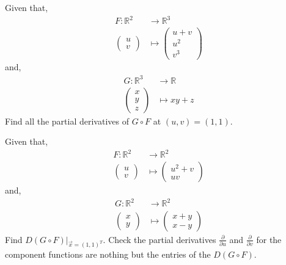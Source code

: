 \begin{example}
Given that,
\begin{align*}
F:\mathbb{R}^2&\to\mathbb{R}^3\\
\begin{pmatrix}
u\\
v
\end{pmatrix}&\mapsto
\begin{pmatrix}
u+v\\
u^2\\
v^3
\end{pmatrix}
\end{align*}
and,
\begin{align*}
G:\mathbb{R}^3&\to\mathbb{R}\\
\begin{pmatrix}
x\\
y\\
z
\end{pmatrix}
&\mapsto
xy+z
\end{align*}
Find all the partial derivatives of $G\circ F$ at $(u,v)=(1,1)$.
\end{example}

\begin{example}
Given that,
\begin{align*}
F:\mathbb{R}^2&\to\mathbb{R}^2\\
\begin{pmatrix}
u\\
v
\end{pmatrix}&\mapsto
\begin{pmatrix}
u^2+v\\
uv
\end{pmatrix}
\end{align*}
and,
\begin{align*}
G:\mathbb{R}^2&\to\mathbb{R}^2\\
\begin{pmatrix}
x\\
y
\end{pmatrix}
&\mapsto
\begin{pmatrix}
x+y\\
x-y
\end{pmatrix}
\end{align*}
Find $\left. D(G\circ F)\right|_{\vec{x}=(1,1)^T}$. 
Check the partial derivatives $\frac{\partial}{\partial u}$
and $\frac{\partial}{\partial v}$ for the component
functions are nothing but the entries of the $D(G\circ F)$.
\end{example}

